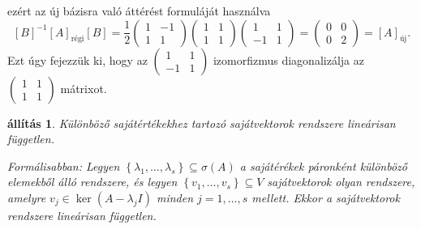 \documentclass[9pt, a4paper, showtrims]{memoir}
\theoremstyle{plain}
\newtheorem{proposition}{állítás}[chapter]
\theoremstyle{remark}
\theoremstyle{definition}
\newcommand{\uj}{\text{új}}
\newcommand{\rgi}{\text{régi}}
\begin{document}
    ezért az új bázisra való áttérést formuláját használva
    \[
        [B]^{-1}[A]_{\rgi}[B]=
        \frac{1}{2}
        \begin{pmatrix}
            1&-1\\
            1&1
        \end{pmatrix}
        \begin{pmatrix}
            1&1\\1&1
        \end{pmatrix}
        \begin{pmatrix}
            1&1\\
            -1&1
        \end{pmatrix}
        =
        \begin{pmatrix}
            0&0\\
            0&2
        \end{pmatrix}
        =[A]_{\uj}.
    \]
    Ezt úgy fejezzük ki, hogy az
    \begin{math}
        \begin{pmatrix}
            1&1\\
            -1&1
        \end{pmatrix}
    \end{math}
    izomorfizmus diagonalizálja az 
    \begin{math}
        \begin{pmatrix}
            1&1\\1&1
        \end{pmatrix}
    \end{math}
    mátrixot.
    \begin{proposition}\label{pr:svlinfgtlen}
        Különböző sajátértékekhez tartozó sajátvektorok rendszere lineárisan független.

        Formálisabban:
        Legyen $\left\{ \lambda_1,\dots,\lambda_s \right\}\subseteq \sigma\left( A \right)$
        a sajátérékek páronként különböző elemekből álló rendszere,
        és legyen $\left\{ v_1,\dots,v_s \right\}\subseteq V$ sajátvektorok olyan rendszere,
        amelyre $v_j\in\ker\left( A-\lambda_jI \right)$ minden $j=1,\dots,s$ mellett.
        Ekkor a sajátvektorok rendszere lineárisan független.
    \end{proposition}
\end{document}
